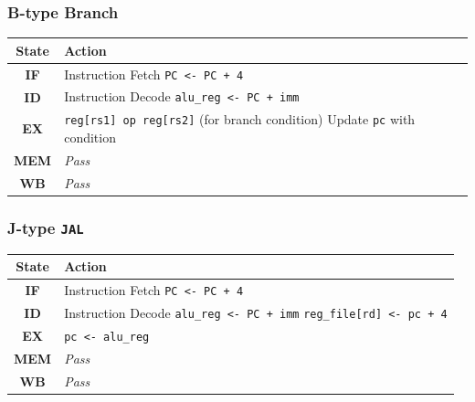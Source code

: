 \documentclass{scrartcl}
\begin{document}
\subsubsection{B-type Branch}
\begin{tabularx}{\textwidth}{ | c | X | }
  \hline
  \textbf{State} & \textbf{Action} \\ \hline
  \textbf{IF} & Instruction Fetch \newline \texttt{PC <- PC + 4} \\ \hline
  \textbf{ID} & Instruction Decode \newline \texttt{alu\_reg <- PC + imm} \\ \hline
  \textbf{EX} & \texttt{reg[rs1] op reg[rs2]} (for branch condition) \newline Update \texttt{pc} with condition \\ \hline
  \textbf{MEM} & \textit{Pass} \\ \hline
  \textbf{WB} & \textit{Pass} \\
  \hline
\end{tabularx}

\subsubsection{J-type \texttt{JAL}}
\begin{tabularx}{\textwidth}{ | c | X | }
  \hline
  \textbf{State} & \textbf{Action} \\ \hline
  \textbf{IF} & Instruction Fetch \newline \texttt{PC <- PC + 4} \\ \hline
  \textbf{ID} & Instruction Decode \newline \texttt{alu\_reg <- PC + imm} \newline \texttt{reg\_file[rd] <- pc + 4} \\ \hline
  \textbf{EX} & \texttt{pc <- alu\_reg} \\ \hline
  \textbf{MEM} & \textit{Pass} \\ \hline
  \textbf{WB} & \textit{Pass} \\
  \hline
\end{tabularx}
\end{document}
